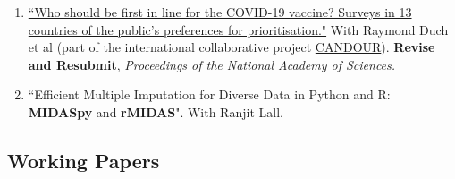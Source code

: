 \documentclass[11pt, a4paper]{article}
\begin{document}
\begin{enumerate}

  \item \href{https://doi.org/10.1101/2021.01.31.21250866}{``Who should be first in line for the COVID-19 vaccine? Surveys in 13 countries of the public’s preferences for prioritisation."} With Raymond Duch et al (part of the international collaborative project \href{https://oxford-candour.com/}{CANDOUR}). \textbf{Revise and Resubmit}, \textit{Proceedings of the National Academy of Sciences.}

  \item ``Efficient Multiple Imputation for Diverse Data in Python and R: \textbf{MIDASpy} and \textbf{rMIDAS}". With Ranjit Lall.

\end{enumerate}

\subsection*{Working Papers}
\end{document}

